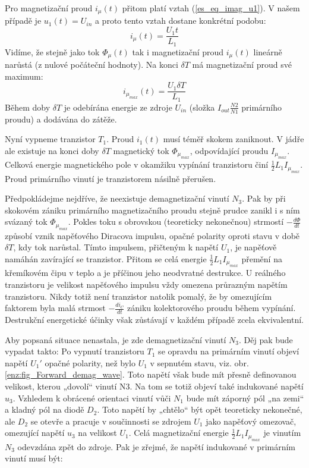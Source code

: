     Pro magnetizační proud $i_\mu(t)$ přitom platí vztah (\ref{es_eq_imag_u1}). V našem případě je
    $u_1(t)=U_{in}$ a proto tento vztah dostane konkrétní podobu:
    \begin{equation}\label{ENZ:eq_forward_imagt}
     i_\mu(t) = \frac{U_1t}{L_1}
    \end{equation}
    Vidíme, že stejně jako tok $\Phi_\mu(t)$ tak i magnetizační proud $i_\mu(t)$ lineárně narůstá 
    (z nulové počáteční hodnoty). Na konci $\delta T$ má magnetizační proud své maximum:
    \begin{equation}\label{ENZ:eq_forward_imag_max}
     i_{\mu_{max}}(t) = \frac{U_1\delta T}{L_1}
    \end{equation}
    Během doby $\delta T$ je odebírána energie ze zdroje $U_{in}$ (složka $I_{out}\frac{N2}{N1}$
    primárního proudu) a dodávána do zátěže.
    
    Nyní vypneme tranzistor $T_1$. Proud $i_1(t)$ musí téměř skokem zaniknout. V jádře ale 
    existuje na konci doby $\delta T$ magnetický tok $\Phi_{\mu_{max}}$, odpovídající proudu 
    $I_{\mu_{max}}$. Celková energie magnetického pole v okamžiku vypínání tranzistoru činí 
    $\frac{1}{2}L_1I_{\mu_{max}}$. Proud primárního vinutí je tranzistorem násilně přerušen.
    
    Předpokládejme nejdříve, že neexistuje demagnetizační vinutí $N_3$. Pak by při skokovém zániku
    primárního magnetizačního proudu stejně prudce zanikl i s ním svázaný tok $\Phi_{\mu_{max}}$. 
    Pokles toku s obrovskou (teoreticky nekonečnou) strmostí $-\frac{d\Phi}{dt}$ způsobí vznik 
    napěťového Diracova impulsu, opačné polarity oproti stavu v době $\delta T$, kdy tok 
    narůstal. Tímto impulsem, přičteným k napětí $U_1$, je napěťově namáhán zavírající se 
    tranzistor. Přitom se celá energie $\frac{1}{2}L_1I_{\mu_{max}}$ přemění na křemíkovém čipu v 
    teplo a je příčinou jeho neodvratné destrukce. U reálného tranzistoru je velikost napěťového 
    impulsu vždy omezena průrazným napětím tranzistoru. Nikdy totiž není tranzistor natolik 
    pomalý, že by omezujícím faktorem byla malá strmost $-\frac{di_C}{dt}$ zániku kolektorového 
    proudu během vypínání. Destrukční energetické účinky však zůstávají v každém případě zcela 
    ekvivalentní.              
    
    Aby popsaná situace nenastala, je zde demagnetizační vinutí $N_3$. Děj pak bude vypadat 
    takto: Po vypnutí tranzistoru $T_1$ se opravdu na primárním vinutí objeví napětí $U_1'$ 
    opačné polarity, než bylo $U_1$ v sepnutém stavu, viz. obr. \ref{enz:fig_Forward_demag_wave}. 
    Toto napětí však bude mít přesně definovanou velikost, kterou „dovolí“ vinutí N3. Na tom se 
    totiž objeví také indukované napětí $u_3$. Vzhledem k obrácené orientaci vinutí vůči $N_1$ 
    bude mít záporný pól „na zemi“ a kladný pól na diodě $D_2$. Toto napětí by „chtělo“ být opět 
    teoreticky nekonečné, ale $D_2$ se otevře a pracuje v součinnosti se zdrojem  $U_1$ jako 
    napěťový omezovač, omezující napětí $u_3$ na velikost $U_1$. Celá magnetizační energie 
    $\frac{1}{2}L_1I_{\mu_{max}}$ je vinutím  $N_3$ odevzdána zpět do zdroje. Pak je zřejmé, že 
    napětí indukované v primárním vinutí musí být:
    
